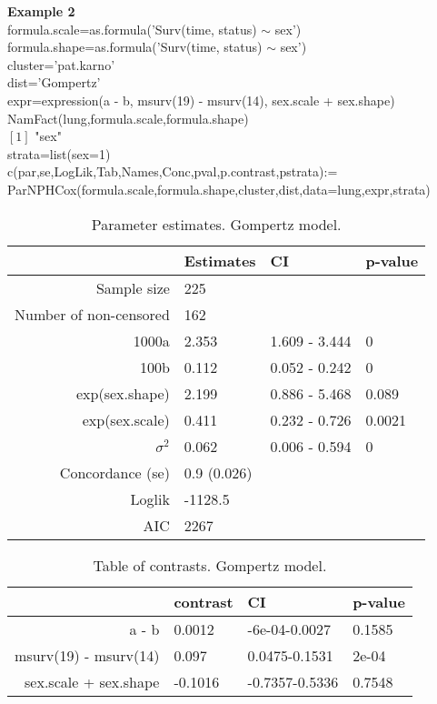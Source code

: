 \documentclass[A4document,12pt]{article}\usepackage[]{graphicx}\usepackage[]{color}
\begin{document}
\clearpage
\newpage
\noindent
\textbf{Example 2}\\
formula.scale=as.formula('Surv(time, status)  $\sim$ sex')\\
formula.shape=as.formula('Surv(time, status)  $\sim$ sex')\\
cluster='pat.karno'\\
dist='Gompertz'\\
expr=expression(a - b, msurv(19) - msurv(14), sex.scale + sex.shape)\\
NamFact(lung,formula.scale,formula.shape)\\
$[1]$ "sex"\\
strata=list(sex=1)\\
c(par,se,LogLik,Tab,Names,Conc,pval,p.contrast,pstrata):=\\
    ParNPHCox(formula.scale,formula.shape,cluster,dist,data=lung,expr,strata)

\begin{table}[ht]
\centering
\begin{tabular}{rlll}
  \hline
 & Estimates & CI & p-value \\ 
  \hline
Sample size & 225 &  &  \\ 
  Number of non-censored & 162 &  &  \\ 
  1000a  & 2.353 & 1.609 - 3.444 & 0 \\ 
  100b & 0.112 & 0.052 - 0.242 & 0 \\ 
  exp(sex.shape) & 2.199 & 0.886 - 5.468 & 0.089 \\ 
  exp(sex.scale) & 0.411 & 0.232 - 0.726 & 0.0021 \\ 
  $\sigma^2$ & 0.062 & 0.006 - 0.594 & 0 \\ 
  Concordance (se) & 0.9 (0.026) &  &  \\ 
  Loglik & -1128.5 &  &  \\ 
  AIC & 2267 &  &  \\ 
   \hline
\end{tabular}
\caption{Parameter estimates. Gompertz model.} 
\end{table}
\begin{table}[ht]
\centering
\begin{tabular}{rlll}
  \hline
 & contrast & CI & p-value \\ 
  \hline
a - b & 0.0012 & -6e-04-0.0027 & 0.1585 \\ 
  msurv(19) - msurv(14) & 0.097 & 0.0475-0.1531 & 2e-04 \\ 
  sex.scale + sex.shape & -0.1016 & -0.7357-0.5336 & 0.7548 \\ 
   \hline
\end{tabular}
\caption{Table of contrasts. Gompertz model.} 
\end{table}
\end{document}
